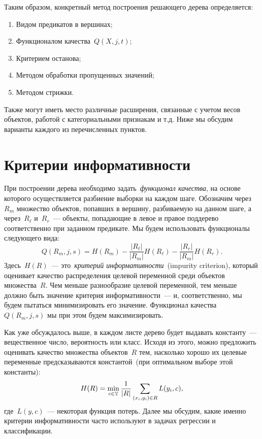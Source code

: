 \documentclass[12pt,fleqn]{article}
\begin{document}
Таким образом, конкретный метод построения решающего дерева определяется:
\begin{enumerate}
    \item Видом предикатов в вершинах;
    \item Функционалом качества~$Q(X, j, t)$;
    \item Критерием останова;
    \item Методом обработки пропущенных значений;
    \item Методом стрижки.
\end{enumerate}
Также могут иметь место различные расширения, связанные с учетом весов объектов,
работой с категориальными признакам и т.д.
Ниже мы обсудим варианты каждого из перечисленных пунктов.

\section{Критерии информативности}
При построении дерева необходимо задать~\emph{функционал качества},
на основе которого осуществляется разбиение выборки на каждом шаге.
Обозначим через~$R_m$ множество объектов, попавших в вершину, разбиваемую на данном шаге,
а через~$R_\ell$ и~$R_r$~--- объекты, попадающие в левое и правое поддерево соответственно
при заданном предикате.
Мы будем использовать функционалы следующего вида:
\[
    Q(R_m, j, s)
    =
    H(R_m)
    -
    \frac{|R_\ell|}{|R_m|}
    H(R_\ell)
    -
    \frac{|R_r|}{|R_m|}
    H(R_r).
\]
Здесь~$H(R)$~--- это~\emph{критерий информативности}~(impurity criterion),
который оценивает качество распределения целевой переменной среди объектов множества~$R$.
Чем меньше разнообразие целевой переменной, тем меньше должно быть значение критерия информативности~---
и, соответственно, мы будем пытаться минимизировать его значение.
Функционал качества~$Q(R_m, j, s)$ мы при этом будем максимизировать.

Как уже обсуждалось выше, в каждом листе дерево будет выдавать константу~--- вещественное число, вероятность
или класс.
Исходя из этого, можно предложить оценивать качество множества объектов~$R$ тем,
насколько хорошо их целевые переменные предсказываются константой~(при оптимальном выборе этой константы):
\[
    H(R)
    =
    \min_{c \in \mathbb{Y}}
    \frac{1}{|R|}
    \sum_{(x_i, y_i) \in R}
        L(y_i, c),
\]
где~$L(y, c)$~--- некоторая функция потерь.
Далее мы обсудим, какие именно критерии информативности часто используют в задачах регрессии и классификации.
\end{document}

